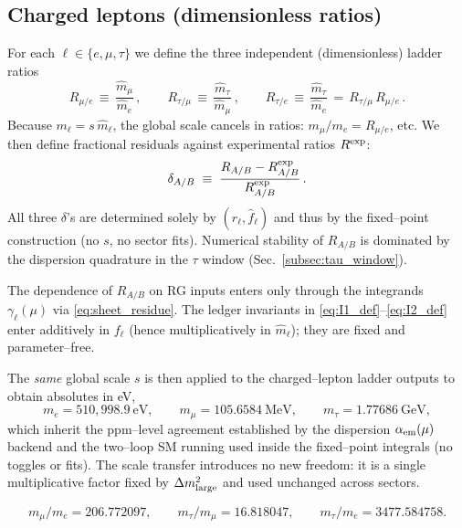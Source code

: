 \documentclass[%
  amsmath,amssymb,
  aps,
 prb,
 floatfix, showkeys
 ]{revtex4-2}
\begin{document}
 \subsection{Charged leptons (dimensionless ratios)}
 \label{subsec:leptons_ratios}
 For each $\ell\in\{e,\mu,\tau\}$ we  define 
  the three independent (dimensionless) ladder ratios
  \begin{equation}
   R_{\mu/e} \,\equiv\, \frac{\widehat m_\mu}{\widehat m_e}\,,\qquad
   R_{\tau/\mu} \,\equiv\, \frac{\widehat m_\tau}{\widehat m_\mu}\,,\qquad
   R_{\tau/e} \,\equiv\, \frac{\widehat m_\tau}{\widehat m_e}
   \,=\, R_{\tau/\mu}\,R_{\mu/e}\,.
   \label{eq:lepton_ratios}
  \end{equation}
 Because $m_\ell = s\,\widehat m_\ell$, the global scale cancels in ratios: $m_\mu/m_e = R_{\mu/e}$, etc.
 We then define fractional residuals against experimental ratios $R^{\rm exp}$:
 \begin{equation}
   \delta_{A/B} \;\equiv\; \frac{R_{A/B} - R^{\rm exp}_{A/B}}{R^{\rm exp}_{A/B}}\,.
   \label{eq:ratio_residuals}
 \end{equation}
 All three $\delta$'s are determined solely by $(r_\ell,\widehat f_\ell)$ and thus by the fixed--point construction (no $s$, no sector fits). Numerical stability of $R_{A/B}$ is dominated by the dispersion quadrature in the $\tau$ window (Sec.~\ref{subsec:tau_window}).
 
 The dependence of $R_{A/B}$ on RG inputs enters only through the integrands
 $\gamma_\ell(\mu)$ via \eqref{eq:sheet_residue}.
 The ledger invariants in \eqref{eq:I1_def}–\eqref{eq:I2_def} enter additively in $f_\ell$
 (hence multiplicatively in $\widehat m_\ell$); they are fixed and parameter--free.
 
 The \emph{same} global scale $s$ is then applied to the charged--lepton
 ladder outputs to obtain absolutes in eV,
 \[
 m_e=510{,}998.9~\text{eV},\qquad
 m_\mu=105.6584~\text{MeV},\qquad
 m_\tau=1.77686~\text{GeV},
 \]
 which inherit the ppm--level agreement established by the dispersion $\alpha_{\rm em}(\mu)$ backend and the two--loop SM running used inside the fixed--point integrals (no toggles or fits). The scale transfer introduces no new freedom: it is a single multiplicative factor fixed by $\Delta m^2_{\rm large}$ and used unchanged across sectors.
 
 \[
 m_\mu/m_e=206.772097,\qquad m_\tau/m_\mu=16.818047,\qquad m_\tau/m_e=3477.584758.
 \]
 
\end{document}

